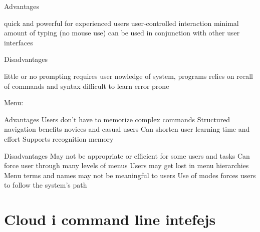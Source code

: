 \documentclass[times, utf8, seminar]{fit}
\begin{document}


Advantages

quick and powerful for experienced users
user-controlled interaction
minimal amount of typing (no mouse use)
can be used in conjunction with other user interfaces

Disadvantages

little or no prompting
requires user nowledge of system, programs
relies on recall of commands and syntax
difficult to learn
error prone  


Menu:

Advantages
Users don't have to memorize complex commands
Structured navigation benefits novices and casual users
Can shorten user learning time and effort
Supports recognition memory


Disadvantages
 May not be appropriate or efficient for some users and tasks
Can force user through many levels of menus
Users may get lost in menu hierarchies
Menu terms and names may not be meaningful to users
Use of modes forces users to follow the system's path



\section{Cloud i command line intefejs}

\end{document}
